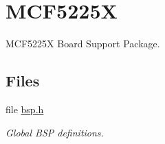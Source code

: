 \hypertarget{group__RTEMSBSPsM68kMCF5225X}{}\section{M\+C\+F5225X}
\label{group__RTEMSBSPsM68kMCF5225X}


M\+C\+F5225X Board Support Package.  


\subsection*{Files}
\begin{DoxyCompactItemize}
\item 
file \mbox{\hyperlink{bsps_2m68k_2mcf5225x_2include_2bsp_8h}{bsp.\+h}}
\begin{DoxyCompactList}\small\item\em Global B\+SP definitions. \end{DoxyCompactList}\end{DoxyCompactItemize}
